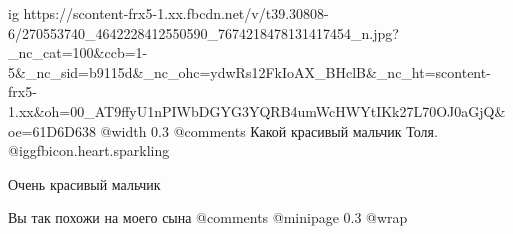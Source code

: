  
 
 
 
 

\ifcmt
  ig https://scontent-frx5-1.xx.fbcdn.net/v/t39.30808-6/270553740_4642228412550590_7674218478131417454_n.jpg?_nc_cat=100&ccb=1-5&_nc_sid=b9115d&_nc_ohc=ydwRs12FkIoAX_BHclB&_nc_ht=scontent-frx5-1.xx&oh=00_AT9ffyU1nPIWbDGYG3YQRB4umWcHWYtIKk27L70OJ0aGjQ&oe=61D6D638
  @width 0.3
  @comments%
		Какой красивый мальчик Толя.  @igg{fbicon.heart.sparkling} 
		
		Очень красивый мальчик

    Вы так похожи на моего сына
  @comments%
  @minipage 0.3
  @wrap \parpic[l]
\fi


